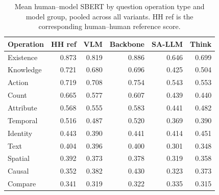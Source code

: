 \begin{table}[h]
\centering
\small


\begin{tabular}{lrrrrr}
\toprule
Operation & HH ref & VLM & Backbone & SA-LLM & Think \\
\midrule
Existence & 0.873 & 0.819 & 0.886 & 0.646 & 0.699 \\
Knowledge & 0.721 & 0.680 & 0.696 & 0.425 & 0.504 \\
Action & 0.719 & 0.708 & 0.754 & 0.543 & 0.553 \\
Count & 0.665 & 0.577 & 0.607 & 0.439 & 0.440 \\
Attribute & 0.568 & 0.555 & 0.583 & 0.441 & 0.482 \\
Temporal & 0.516 & 0.487 & 0.520 & 0.369 & 0.390 \\
Identity & 0.443 & 0.390 & 0.441 & 0.414 & 0.451 \\
Text & 0.404 & 0.396 & 0.400 & 0.301 & 0.348 \\
Spatial & 0.392 & 0.373 & 0.378 & 0.319 & 0.358 \\
Causal & 0.352 & 0.382 & 0.430 & 0.323 & 0.373 \\
Compare & 0.341 & 0.319 & 0.322 & 0.335 & 0.315 \\
\bottomrule
\end{tabular}
\caption{Mean human--model SBERT by question operation type and model group, pooled across all variants. HH ref is the corresponding human--human reference score.}
\label{tab:robustness_op_group}
\end{table}
